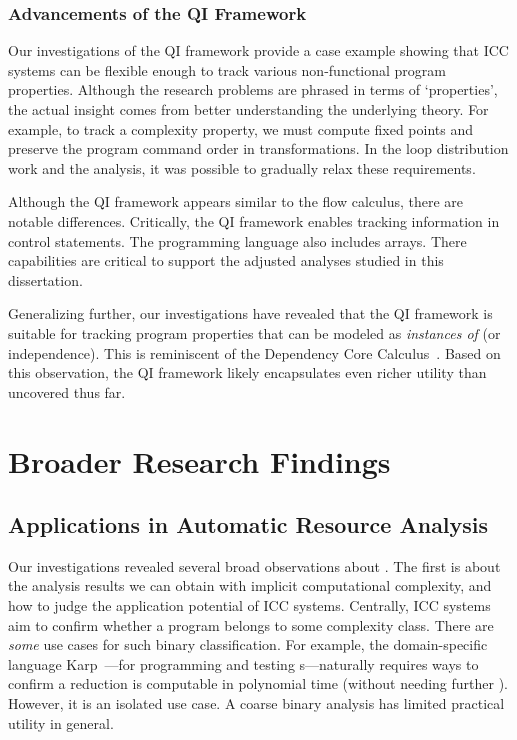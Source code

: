 \subsubsection{Advancements of the QI Framework}
\label{subsubsec:qi-res}

Our investigations of the QI framework provide a case example showing that ICC
systems can be flexible enough to track various non-functional program
properties. Although the research problems are
phrased in terms of `properties', the actual insight comes from better
understanding the underlying theory. For example, to track a complexity
property, we must compute fixed points and preserve the program command order in
transformations. In the loop distribution work and the 
analysis, it was possible to gradually relax these requirements.

Although the QI framework appears similar to the flow calculus, there are
notable differences. Critically, the QI framework enables tracking information
in control statements. The programming language also includes arrays. There
capabilities are critical to support the adjusted analyses studied in this
dissertation.

Generalizing further, our investigations have revealed that the  QI framework is
suitable for tracking program properties that can be modeled as \emph{instances
of } (or independence). This is reminiscent of the
Dependency Core Calculus~\cite{abadi1999b}. Based on this observation, the QI
framework likely encapsulates even richer utility than uncovered thus far.

\section{Broader Research Findings}
\label{sec:broader-findings}

\subsection{Applications in Automatic Resource Analysis}
\label{subsec:res-resource-analysis}

Our investigations revealed several broad observations about .
The first is about the analysis results we can obtain with implicit computational complexity, and how to judge the application potential of ICC systems.
Centrally, ICC systems aim to confirm whether a program belongs to some complexity class.
There are \emph{some} use cases for such binary classification.
For example, the domain-specific language Karp~\cite{zhang2022}---for programming and testing s---naturally requires ways to confirm a reduction is computable in polynomial time (without needing further ).
However, it is an isolated use case.
A coarse binary analysis has limited practical utility in general.

